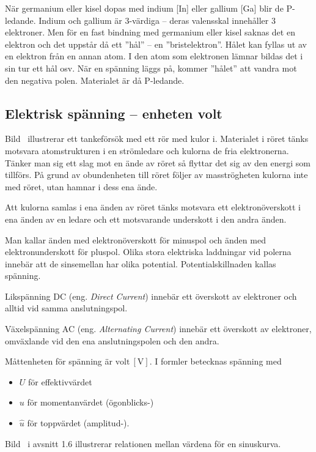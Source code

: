 När germanium eller kisel dopas med indium [In] eller gallium [Ga] blir de
P-ledande.
Indium och gallium är 3-värdiga -- deras valensskal innehåller 3 elektroner.
Men för en fast bindning med germanium eller kisel saknas det en elektron och
det uppstår då ett ''hål'' -- en ''bristelektron''.
Hålet kan fyllas ut av en elektron från en annan atom.
I den atom som elektronen lämnar bildas det i sin tur ett hål osv.
När en spänning läggs på, kommer ''hålet'' att vandra mot den negativa polen.
Materialet är då P-ledande.

\subsection{Elektrisk spänning -- enheten volt}
\label{subsec:spaenning}


Bild~ illustrerar ett tankeförsök med ett rör med kulor i.
Materialet i röret tänks motsvara atomstrukturen i en strömledare och kulorna
de fria elektronerna.
Tänker man sig ett slag mot en ände av röret så flyttar det sig av den energi
som tillförs.
På grund av obundenheten till röret följer av masströgheten kulorna inte med
röret, utan hamnar i dess ena ände.

Att kulorna samlas i ena änden av röret tänks motsvara ett elektronöverskott i
ena änden av en ledare och ett motsvarande underskott i den andra änden.

Man kallar änden med elektronöverskott för minuspol och änden med
elektronunderskott för pluspol.
Olika stora elektriska laddningar vid polerna innebär att de sinsemellan har
olika potential.
Potentialskillnaden kallas spänning.

Likspänning DC (eng. \emph{Direct Current}) innebär ett överskott av elektroner
och alltid vid samma anslutningspol.

Växelspänning AC (eng. \emph{Alternating Current}) innebär ett överskott av
elektroner, omväxlande vid den ena anslutningspolen och den andra.

Måttenheten för spänning är \(\mathrm{volt\ [V]}\).
I formler betecknas spänning med
\begin{itemize}
  \item \(U\) för effektivvärdet
  \item \(u\) för momentanvärdet (ögonblicks-)
  \item \(\hat{u}\) för toppvärdet (amplitud-).
\end{itemize}
Bild~ i avsnitt 1.6 illustrerar relationen mellan värdena
för en sinuskurva.

